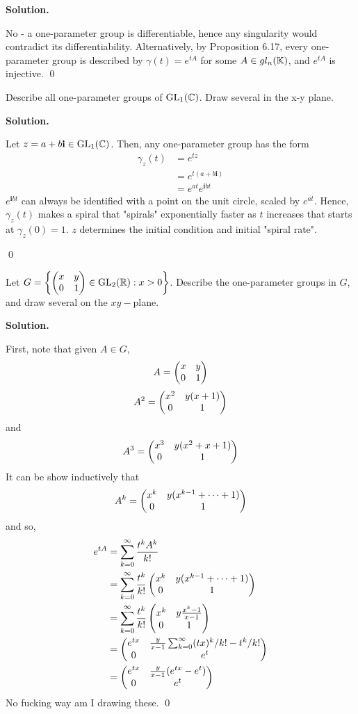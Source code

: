 \documentclass[12pt]{book}
\theoremstyle{definition}
\newenvironment{solution}
{%
  \par\noindent\textbf{Solution.}\quad
}
{%
  \qed\par
}
\begin{document}
\begin{solution}
  No - a one-parameter group is differentiable, hence any singularity would contradict its differentiability.
  Alternatively, by Proposition 6.17, every one-parameter group is described by $\gamma(t) = e^{tA}$ for some $A \in gl_n(\mathbb{K})$, and $e^{tA}$ is injective.
\end{solution}

\begin{taggedexercise}[\textcolor{yellow}{WIP}]
  Describe all one-parameter groups of $\mathrm{GL}_{1}(\mathbb{C})$.
  Draw several in the x-y plane.
\end{taggedexercise}

\begin{solution}
  Let $z = a + b\mathbf{i} \in \mathrm{GL}_{1}(\mathbb{C})$.
  Then, any one-parameter group has the form
  \[\begin{aligned}
    \gamma_z(t) &= e^{tz} \\
                &= e^{t(a+ b\mathbf{i})} \\
                &= e^{at}e^{\mathbf{i}bt}
  \end{aligned}
  \]
  $e^{\mathbf{i}bt}$ can always be identified with a point on the unit circle, scaled by $e^{at}$.
  Hence, $\gamma_z(t)$ makes a spiral that "spirals" exponentially faster as $t$ increases that starts at $\gamma_z(0) = 1$.
  $z$ determines the initial condition and initial "spiral rate".

\end{solution}

\begin{taggedexercise}[\textcolor{yellow}{WIP}]
  Let $G = \left\{ \begin{pmatrix} x & y \\ 0 & 1 \end{pmatrix} \in \mathrm{GL}_{2}(\mathbb{R}) : x > 0 \right\}$.
  Describe the one-parameter groups in $G$, and draw several on the $xy-$plane.
\end{taggedexercise}

\begin{solution}
  First, note that given $A \in G$,
  \[
   A = \begin{pmatrix} x & y \\ 0 & 1 \end{pmatrix}
  \]
  \[A^2 =  \begin{pmatrix} x^2 & y(x+1) \\ 0 & 1 \end{pmatrix}\]
  and
  \[A^3 = \begin{pmatrix} x^3 & y(x^2 + x + 1) \\ 0 & 1 \end{pmatrix}\]
  It can be show inductively that
  \[
  A^k = \begin{pmatrix} x^k & y(x^{k-1} + \cdots + 1) \\ 0 & 1 \end{pmatrix}
  \]
  and so,
  \[
  \begin{aligned}
    e^{tA} &= \sum_{k=0}^\infty \frac{t^kA^k}{k!} \\
           &= \sum_{k=0}^\infty \frac{t^k}{k!} \begin{pmatrix} x^k & y(x^{k-1} + \cdots + 1) \\ 0 & 1 \end{pmatrix} \\
           &= \sum_{k=0}^\infty \frac{t^k}{k!} \begin{pmatrix} x^k & y\frac{x^k-1}{x-1} \\ 0 & 1 \end{pmatrix} \\
           &= \begin{pmatrix} e^{tx} & \frac{y}{x-1}\sum_{k=0}^\infty (tx)^k/k! - t^k/k! \\ 0 & e^t \end{pmatrix} \\
           &= \begin{pmatrix} e^{tx} & \frac{y}{x-1}(e^{tx} - e^t) \\ 0 & e^t \end{pmatrix} \\
  \end{aligned}
  \]
  No fucking way am I drawing these.
\end{solution}
\end{document}
